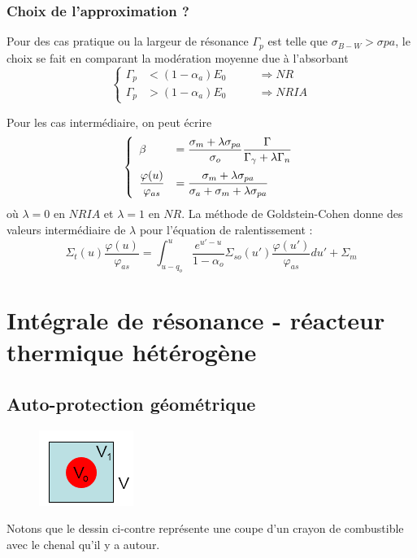 	\newpage
	\subsubsection{Choix de l'approximation ?}
	Pour des cas pratique ou la largeur de résonance $\Gamma_p$ est telle que $\sigma_{B-W}>
	\sigma{pa}$, le choix se fait en comparant la modération moyenne due à l'absorbant
	\begin{equation}
	\left\{\begin{array}{lll}
	\Gamma_p &< (1-\alpha_a)E_0&\qquad\Rightarrow NR\\
	\Gamma_p &> (1-\alpha_a)E_0&\qquad\Rightarrow NRIA
	\end{array}\right. 
	\end{equation}
	
	Pour les cas intermédiaire, on peut écrire 
	\begin{equation}
	\left\{\begin{array}{ll}
	\beta  &\DS= \frac{{{\sigma _m} + \lambda {\sigma _{pa}}}}{{{\sigma _o}}}\frac{\Gamma }{{{\Gamma _
	\gamma } + \lambda {\Gamma _n}}}\vspace{2mm}\\
	\dfrac{{\varphi (u)}}{{{\varphi _{as}}}} &\DS= \frac{{{\sigma _m} + \lambda {\sigma _{pa}}}}
	{{{\sigma	 _a} + {\sigma _m} + \lambda {\sigma _{pa}}}}\
	\end{array}\right.
	\end{equation}
	où $\lambda=0$ en $NRIA$ et $\lambda=1$ en $NR$. La méthode de Goldstein-Cohen donne des 
	valeurs intermédiaire de $\lambda$ pour l'équation de ralentissement :
	\begin{equation}
	{\Sigma _t}(u)\frac{{\varphi (u)}}{{{\varphi _{as}}}} = \int_{u - {q_o}}^u    \frac{{{e^{u' -
	 u}}}}{{1 - {\alpha _o}}}{\Sigma _{so}}(u')\frac{{\varphi (u')}}{{{\varphi _{as}}}}du' + {\Sigma
	  _m}
	\end{equation}
	
\section{Intégrale de résonance - réacteur thermique hétérogène}
	\subsection{Auto-protection géométrique}
	\begin{figure}
	\vspace{-8mm}
	\includegraphics[scale=0.7]{ch8/image3}
	\end{figure}	
	Notons que le dessin ci-contre représente une coupe d'un crayon de combustible avec le chenal
	qu'il y a autour.


